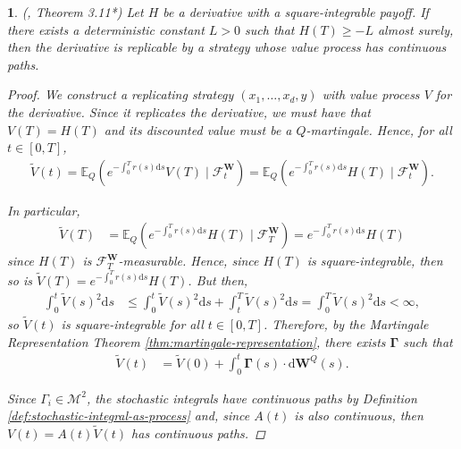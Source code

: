 \documentclass[english]{article}
\numberwithin{equation}{section}
\numberwithin{figure}{section}
\theoremstyle{bolddescit}
\newtheorem{theorem}{\protect\theoremname}[section]
\theoremstyle{definition}
\theoremstyle{definition}
\theoremstyle{plain}
\theoremstyle{plain}
\theoremstyle{bolddesc}
\theoremstyle{plain}
\theoremstyle{remark}
\providecommand{\theoremname}{Theorem}
\begin{document}
\begin{theorem}\label{thm:bs-replicability}
  (\cite{capinski_blackscholes_2012}, Theorem 3.11*)
  Let $H$ be a derivative with a square-integrable payoff. If there exists a deterministic constant $L > 0$ such that $H(T) \ge -L$ almost surely, then the derivative is replicable by a strategy whose value process has continuous paths.

  \begin{proof}
    We construct a replicating strategy $(x_1,\ldots,x_d,y)$ with value process $V$ for the derivative. Since it replicates the derivative, we must have that $V(T) = H(T)$ and its discounted value must be a $Q$-martingale. Hence, for all $t \in [0,T]$,
    \begin{align*}
      \widetilde{V}(t)
      = \mathbb{E}_Q\left(e^{-\int_0^T r(s) \mathrm{d}s} V(T) \mid \mathcal{F}^\mathbf{W}_t\right)
      = \mathbb{E}_Q\left(e^{-\int_0^T r(s) \mathrm{d}s} H(T) \mid \mathcal{F}^\mathbf{W}_t\right).
    \end{align*}

    In particular,
    \begin{align*}
      \widetilde{V}(T)
      &= \mathbb{E}_Q\left(e^{-\int_0^T r(s)\mathrm{d}s} H(T) \mid \mathcal{F}^\mathbf{W}_T\right)
      = e^{-\int_0^T r(s)\mathrm{d}s} H(T)
    \end{align*}
    since $H(T)$ is $\mathcal{F}^\mathbf{W}_T$-measurable. Hence, since $H(T)$ is square-integrable, then so is $\widetilde{V}(T) = e^{-\int_0^T r(s)\mathrm{d}s} H(T)$. But then,
    \begin{align*}
      \int_0^t \widetilde{V}(s)^2 \mathrm{d}s
      &\le \int_0^t \widetilde{V}(s)^2 \mathrm{d}s + \int_t^T \widetilde{V}(s)^2 \mathrm{d}s
      = \int_0^T \widetilde{V}(s)^2 \mathrm{d}s < \infty,
    \end{align*}
    so $\widetilde{V}(t)$ is square-integrable for all $t \in [0,T]$. Therefore, by the Martingale Representation Theorem \ref{thm:martingale-representation}, there exists $\mathbf{\Gamma}$ such that
    \begin{align}\label{eq:bs-repl-deriv-gamma}
      \widetilde{V}(t)
      &= \widetilde{V}(0) + \int_0^t \mathbf{\Gamma}(s) \cdot \mathrm{d}\mathbf{W}^Q(s).
    \end{align}

    Since $\Gamma_i \in \mathcal{M}^2$, the stochastic integrals have continuous paths by Definition \ref{def:stochastic-integral-as-process} and, since $A(t)$ is also continuous, then $V(t) = A(t) \widetilde{V}(t)$ has continuous paths.


\end{proof}
\end{theorem}
\end{document}
